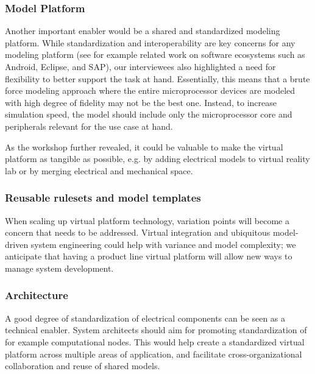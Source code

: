 \subsubsection{Model Platform}
Another important enabler would be a shared and standardized modeling platform.
While standardization and interoperability are key concerns for any modeling platform (see for example related work on software ecosystems such as Android, Eclipse, and SAP), our interviewees also highlighted a need for flexibility to better support the task at hand.
Essentially, this means that a brute force modeling approach where the entire microprocessor devices are modeled with high degree of fidelity may not be the best one.
Instead, to increase simulation speed, the model should include only the microprocessor core
and peripherals relevant for the use case at hand.

As the workshop further revealed, it could be valuable to make the virtual platform as tangible as possible, e.g. by adding electrical models to virtual reality lab or by merging electrical and mechanical space.

\subsubsection{Reusable rulesets and model templates}
When scaling up virtual platform technology, variation points will become a concern that needs to be addressed. Virtual integration and ubiquitous model-driven system engineering could help with variance and model complexity; we anticipate that having a product line virtual platform will allow new ways to manage system development.

\subsubsection{Architecture}
A good degree of standardization of electrical components can be seen as a technical enabler. System architects should aim for promoting standardization of for example computational nodes.%
This would help create a standardized virtual platform across multiple areas of application, and  facilitate cross-organizational collaboration and reuse of shared models.

